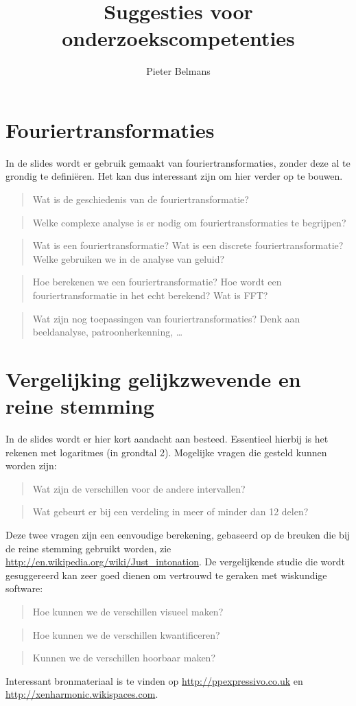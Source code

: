 \documentclass[10pt,a4paper]{article}
\title{Suggesties voor onderzoekscompetenties}
\author{Pieter Belmans}
\begin{document}
\maketitle

\section{Fouriertransformaties}
In de slides wordt er gebruik gemaakt van fouriertransformaties, zonder deze al te grondig te defini\"eren. Het kan dus interessant zijn om hier verder op te bouwen.
\begin{quote}
  Wat is de geschiedenis van de fouriertransformatie?
\end{quote}
\begin{quote}
  Welke complexe analyse is er nodig om fouriertransformaties te begrijpen?
\end{quote}
\begin{quote}
  Wat is een fouriertransformatie? Wat is een discrete fouriertransformatie? Welke gebruiken we in de analyse van geluid?
\end{quote}
\begin{quote}
  Hoe berekenen we een fouriertransformatie? Hoe wordt een fouriertransformatie in het echt berekend? Wat is FFT?
\end{quote}
\begin{quote}
  Wat zijn nog toepassingen van fouriertransformaties? Denk aan beeldanalyse, patroonherkenning, \dots
\end{quote}


\section{Vergelijking gelijkzwevende en reine stemming}
In de slides wordt er hier kort aandacht aan besteed. Essentieel hierbij is het rekenen met logaritmes (in grondtal 2). Mogelijke vragen die gesteld kunnen worden zijn:
\begin{quote}
  Wat zijn de verschillen voor de andere intervallen?
\end{quote}
\begin{quote}
  Wat gebeurt er bij een verdeling in meer of minder dan 12 delen?
\end{quote}
Deze twee vragen zijn een eenvoudige berekening, gebaseerd op de breuken die bij de reine stemming gebruikt worden, zie \url{http://en.wikipedia.org/wiki/Just_intonation}. De vergelijkende studie die wordt gesuggereerd kan zeer goed dienen om vertrouwd te geraken met wiskundige software:
\begin{quote}
  Hoe kunnen we de verschillen visueel maken?
\end{quote}
\begin{quote}
  Hoe kunnen we de verschillen kwantificeren?
\end{quote}
\begin{quote}
  Kunnen we de verschillen hoorbaar maken?
\end{quote}
Interessant bronmateriaal is te vinden op \url{http://ppexpressivo.co.uk} en \url{http://xenharmonic.wikispaces.com}.
\end{document}
